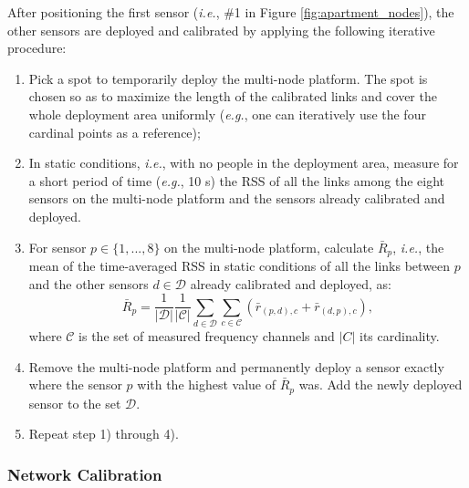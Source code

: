 \documentclass[conference]{IEEEtran}
\begin{document}
After positioning the first sensor (\emph{i.e.}, \#1 in Figure \ref{fig:apartment_nodes}), the other sensors are deployed and calibrated by applying the following iterative procedure:
\begin{enumerate}
    \item Pick a spot to temporarily deploy the multi-node platform. The spot is chosen so as to maximize the length of the calibrated links and cover the whole deployment area uniformly (\emph{e.g.}, one can iteratively use the four cardinal points as a reference);
    \item In static conditions, \emph{i.e.}, with no people in the deployment area, measure for a short period of time (\emph{e.g.}, 10 s) the RSS of all the links among the eight sensors on the multi-node platform and the sensors already calibrated and deployed.
    \item For sensor $p \in \{1,...,8\}$ on the multi-node platform, calculate $\bar{R}_p$, \emph{i.e.}, the mean of the time-averaged RSS in static conditions of all the links between $p$ and the other sensors $d \in \mathcal{D}$ already calibrated and deployed, as:
        \begin{equation} \label{eq:incremental_calibration}
            \bar{R}_p = \frac{1}{|\mathcal{D}|} \frac{1}{|\mathcal{C}|} \sum_{d \in \mathcal{D}} \sum_{c \in \mathcal{C}} (\bar{r}_{(p,d),c} + \bar{r}_{(d,p),c}),
        \end{equation}
    where $\mathcal{C}$ is the set of measured frequency channels and $|C|$ its cardinality.
    \item Remove the multi-node platform and permanently deploy a sensor exactly where the sensor $p$ with the highest value of $\bar{R}_p$ was. Add the newly deployed sensor to the set $\mathcal{D}$.
    \item Repeat step 1) through 4).
\end{enumerate}

\subsubsection{Network Calibration}
\label{sec:network_calibration}
\end{document}
